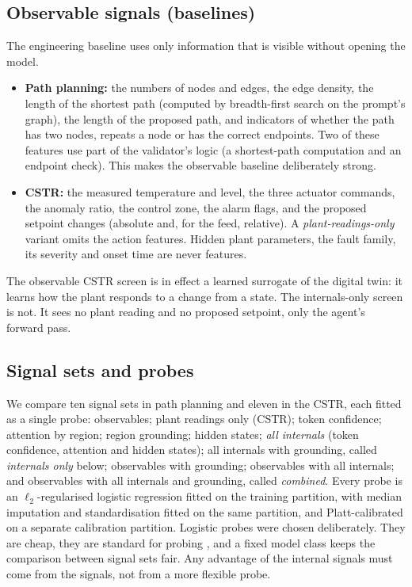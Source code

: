 \subsection{Observable signals (baselines)}
The engineering baseline uses only information that is visible without opening the model.
\begin{itemize}
\item \textbf{Path planning:} the numbers of nodes and edges, the edge density, the length of the shortest path
(computed by breadth-first search on the prompt's graph), the length of the proposed path, and indicators of
whether the path has two nodes, repeats a node or has the correct endpoints. Two of these features use part of
the validator's logic (a shortest-path computation and an endpoint check). This makes the observable baseline
deliberately strong.
\item \textbf{CSTR:} the measured temperature and level, the three actuator commands, the anomaly ratio, the
control zone, the alarm flags, and the proposed setpoint changes (absolute and, for the feed, relative). A
\emph{plant-readings-only} variant omits the action features. Hidden plant parameters, the fault family, its
severity and onset time are never features.
\end{itemize}
The observable CSTR screen is in effect a learned surrogate of the digital twin: it learns how the plant responds
to a change from a state. The internals-only screen is not. It sees no plant reading and no proposed setpoint,
only the agent's forward pass.

\subsection{Signal sets and probes}
We compare ten signal sets in path planning and eleven in the CSTR, each fitted as a single probe: observables;
plant readings only (CSTR); token confidence; attention by region; region grounding; hidden states; \emph{all
internals} (token confidence, attention and hidden states); all internals with grounding, called
\emph{internals only} below; observables with grounding; observables with all internals; and observables with all
internals and grounding, called \emph{combined}. Every probe is an $\ell_2$-regularised logistic regression fitted
on the training partition, with median imputation and standardisation fitted on the same partition, and
Platt-calibrated \citep{platt1999} on a separate calibration partition. Logistic probes were chosen deliberately.
They are cheap, they are standard for probing \citep{alain2016probes,belinkov2022probing}, and a fixed model
class keeps the comparison between signal sets fair. Any advantage of the internal signals must come from the
signals, not from a more flexible probe.
